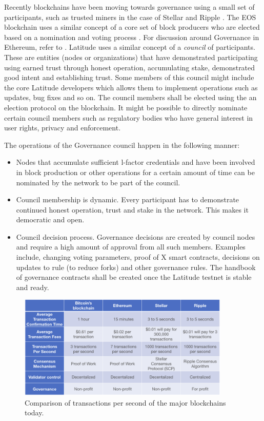 Recently blockchains have been moving towards governance using a small set of participants, such as trusted miners in
the case of Stellar and Ripple \cite{stellar_gateway}. The EOS blockchain uses a similar concept of a core set of block
producers who are elected based on a nomination and voting process \cite{eos_producers}. For discussion around
Governance in Ethereum, refer to \cite{buterin_gov}. Latitude uses a similar concept of a {\em council} of participants.
These are entities (nodes or organizations) that have demonstrated participating using earned trust through honest
operation, accumulating stake, demonstrated good intent and establishing trust. Some members of this council might
include the core Latitude developers which allows them to implement operations such as updates, bug fixes and so on. The
council members shall be elected using the an election protocol on the blockchain. It might be possible to directly
nominate certain council members such as regulatory bodies who have general interest in user rights, privacy and
enforcement. 


The operations of the Governance council happen in the following manner:
\begin{itemize}
    \item Nodes that accumulate sufficient l-factor credentials and have been involved in block production or other
        operations for a certain amount of time can be nominated by the network to be part of the council. 
    \item Council membership is dynamic. Every participant has to demonstrate continued honest operation, trust and
        stake in the network. This makes it democratic and open.
    \item Council decision process. Governance decisions are created by council nodes and require a high amount of
        approval from all such members. Examples include, changing voting parameters, proof of X smart contracts,
        decisions on updates to rule (to reduce forks) and other governance rules. The handbook of governance contracts
        shall be created once the Latitude testnet is stable and ready.
\end{itemize}

\begin{figure}[t]
    \centering
    \includegraphics[width=0.90\textwidth]{tps_speed2.png}
  \caption{Comparison of transactions per second of the major blockchains today.}
    \label{fig:tps_speed}
\end{figure}
